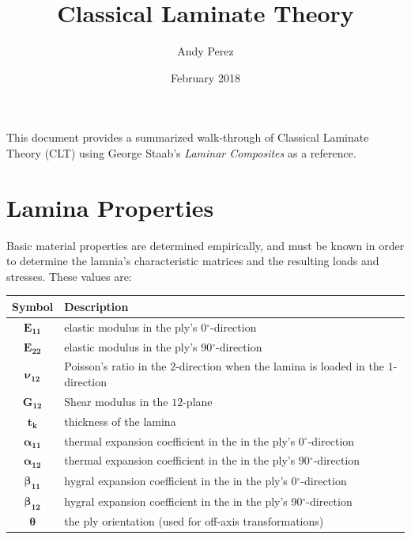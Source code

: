 \documentclass{article}
\title{Classical Laminate Theory}
\author{Andy Perez}
\date{February 2018}
\begin{document}
\setlength{\parindent}{0cm}
\renewcommand{\thefootnote}{\roman{footnote}}

\maketitle

This document provides a summarized walk-through of Classical Laminate Theory (CLT) using George Staab's \textit{Laminar Composites} \cite{staab} as a reference.


\section{Lamina Properties}
\label{sec:lamina_properties}
Basic material properties are determined empirically, and must be known in order to determine the lamnia's characteristic matrices and the resulting loads and stresses. These values are:
  \begin{center}
    \begin{table}[h!]
      \centering
      \label{tbl:lamprop}
      \vspace{1mm}
      \begin{tabular}{cl}
        Symbol & Description \\
        \hline \hline
        $\bm{E_{11}}$ & elastic modulus in the ply's 0$^{\circ}$-direction \\
        $\bm{E_{22}}$ & elastic modulus in the ply's 90$^{\circ}$-direction \\
        $\bm{\nu_{12}}$ & Poisson's ratio in the $2$-direction when the lamina is loaded in the $1$-direction \\
        $\bm{G_{12}}$ & Shear modulus in the $12$-plane \\
        $\bm{t_{k}}$ & thickness of the lamina \\
        $\bm{\alpha_{11}}$ & thermal expansion coefficient in the in the ply's 0$^{\circ}$-direction \\
        $\bm{\alpha_{12}}$ & thermal expansion coefficient in the in the ply's 90$^{\circ}$-direction \\
        $\bm{\beta_{11}}$ & hygral expansion coefficient in the in the ply's 0$^{\circ}$-direction \\
        $\bm{\beta_{12}}$ & hygral expansion coefficient in the in the ply's 90$^{\circ}$-direction \\
        $\bm{\theta}$ & the ply orientation (used for off-axis transformations)
      \end{tabular}
    \end{table}
  \end{center}
\end{document}
